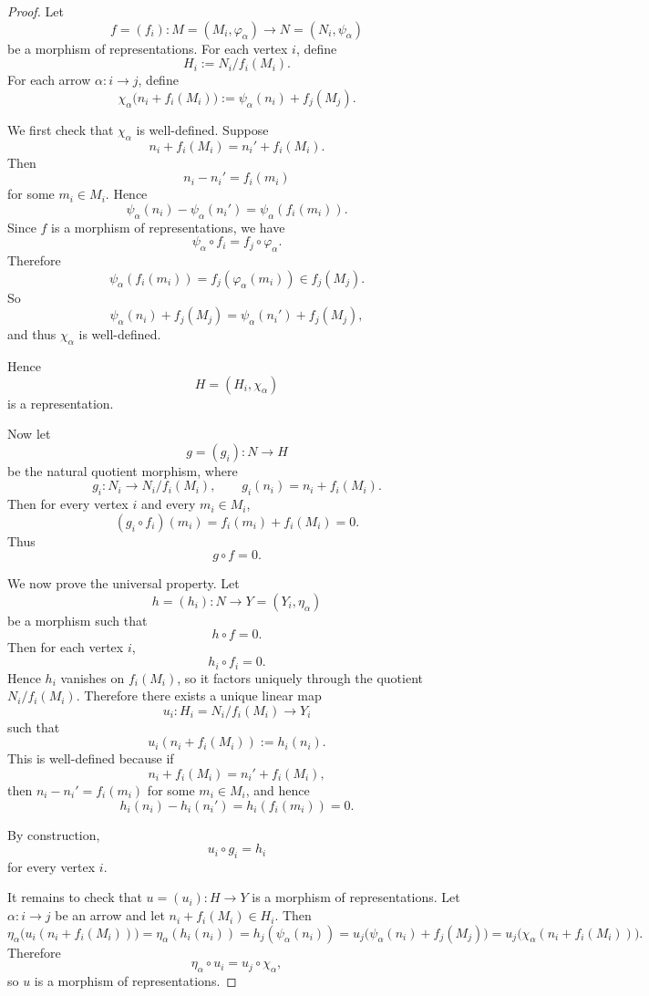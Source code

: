 \documentclass[11pt, a4paper]{report}
\begin{document}
\begin{proof}
    Let
    \[
    f=(f_i):M=(M_i,\varphi_\alpha)\to N=(N_i,\psi_\alpha)
    \]
    be a morphism of representations. For each vertex $i$, define
    \[
    H_i:=N_i/f_i(M_i).
    \]
    For each arrow $\alpha:i\to j$, define
    \[
    \chi_\alpha\bigl(n_i+f_i(M_i)\bigr):=\psi_\alpha(n_i)+f_j(M_j).
    \]
    
    We first check that $\chi_\alpha$ is well-defined. Suppose
    \[
    n_i+f_i(M_i)=n_i'+f_i(M_i).
    \]
    Then
    \[
    n_i-n_i'=f_i(m_i)
    \]
    for some $m_i\in M_i$. Hence
    \[
    \psi_\alpha(n_i)-\psi_\alpha(n_i')
    =\psi_\alpha(f_i(m_i)).
    \]
    Since $f$ is a morphism of representations, we have
    \[
    \psi_\alpha\circ f_i=f_j\circ \varphi_\alpha.
    \]
    Therefore
    \[
    \psi_\alpha(f_i(m_i))
    =f_j(\varphi_\alpha(m_i))\in f_j(M_j).
    \]
    So
    \[
    \psi_\alpha(n_i)+f_j(M_j)=\psi_\alpha(n_i')+f_j(M_j),
    \]
    and thus $\chi_\alpha$ is well-defined.
    
    Hence
    \[
    H=(H_i,\chi_\alpha)
    \]
    is a representation.
    
    Now let
    \[
    g=(g_i):N\to H
    \]
    be the natural quotient morphism, where
    \[
    g_i:N_i\to N_i/f_i(M_i),\qquad g_i(n_i)=n_i+f_i(M_i).
    \]
    Then for every vertex $i$ and every $m_i\in M_i$,
    \[
    (g_i\circ f_i)(m_i)=f_i(m_i)+f_i(M_i)=0.
    \]
    Thus
    \[
    g\circ f=0.
    \]
    
    We now prove the universal property. Let
    \[
    h=(h_i):N\to Y=(Y_i,\eta_\alpha)
    \]
    be a morphism such that
    \[
    h\circ f=0.
    \]
    Then for each vertex $i$,
    \[
    h_i\circ f_i=0.
    \]
    Hence $h_i$ vanishes on $f_i(M_i)$, so it factors uniquely through the quotient
    $N_i/f_i(M_i)$. Therefore there exists a unique linear map
    \[
    u_i:H_i=N_i/f_i(M_i)\to Y_i
    \]
    such that
    \[
    u_i(n_i+f_i(M_i)):=h_i(n_i).
    \]
    This is well-defined because if
    \[
    n_i+f_i(M_i)=n_i'+f_i(M_i),
    \]
    then $n_i-n_i'=f_i(m_i)$ for some $m_i\in M_i$, and hence
    \[
    h_i(n_i)-h_i(n_i')=h_i(f_i(m_i))=0.
    \]
    
    By construction,
    \[
    u_i\circ g_i=h_i
    \]
    for every vertex $i$.
    
    It remains to check that $u=(u_i):H\to Y$ is a morphism of representations.
    Let $\alpha:i\to j$ be an arrow and let $n_i+f_i(M_i)\in H_i$. Then
    \[
    \eta_\alpha\bigl(u_i(n_i+f_i(M_i))\bigr)
    =\eta_\alpha(h_i(n_i))
    =h_j(\psi_\alpha(n_i))
    =u_j\bigl(\psi_\alpha(n_i)+f_j(M_j)\bigr)
    =u_j\bigl(\chi_\alpha(n_i+f_i(M_i))\bigr).
    \]
    Therefore
    \[
    \eta_\alpha\circ u_i=u_j\circ \chi_\alpha,
    \]
    so $u$ is a morphism of representations.
    

\end{proof}
\end{document}

